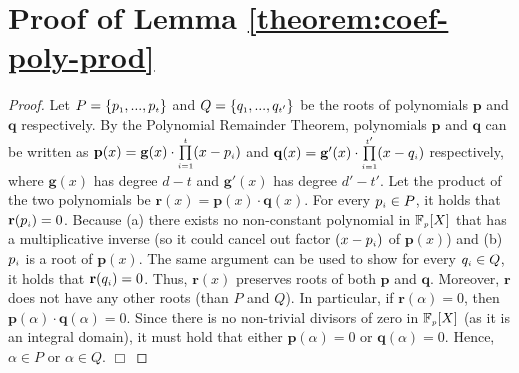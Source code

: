 

\section{Proof of Lemma \ref{theorem:coef-poly-prod}}\label{sec::proof-of-poly-union}

\begin{proof}
Let $P=\{p_{\scriptscriptstyle 1},...,p_{\scriptscriptstyle t}\}$ and $Q=\{q_{\scriptscriptstyle 1},...,q_{\scriptscriptstyle t'}\}$ be the roots of polynomials $\mathbf{p}$ and   $\mathbf{q}$  respectively.  By the Polynomial Remainder Theorem,  polynomials $\mathbf{p}$ and $\mathbf{q}$  can be written as $\mathbf{p}(x)=\mathbf{g}(x)\cdot\prod\limits_{\scriptscriptstyle i=1}^{\scriptscriptstyle t}(x-p_{\scriptscriptstyle i})$ and $\mathbf{q}(x)=\mathbf{g}'(x)\cdot\prod\limits_{\scriptscriptstyle i=1}^{\scriptscriptstyle t'}(x-q_{\scriptscriptstyle i})$ respectively, where $\mathbf{g}(x)$ has degree $d-t$ and $\mathbf{g}'(x)$ has degree $d'-t'$. Let the product of the two polynomials be $\mathbf{r}(x)=\mathbf{p}(x)\cdot \mathbf{q}(x)$. For every $p_{\scriptscriptstyle i}\in P$, it holds  that $\mathbf{r}(p_{\scriptscriptstyle i})=0$. Because (a) there exists no non-constant polynomial in $\mathbb{F}_{\scriptscriptstyle p}[X]$ that has a multiplicative inverse (so it could cancel out factor $(x-p_{\scriptscriptstyle i})$ of $\mathbf{p}(x)$) and (b) $p_{\scriptscriptstyle i}$ is a root of $\mathbf{p}(x)$. The same argument  can be used to show for every $q_{\scriptscriptstyle i}\in Q$, it holds  that $\mathbf{r}(q_{\scriptscriptstyle i})=0$. Thus, $\mathbf{r}(x)$ preserves  roots of  both  $\mathbf{p}$ and $\mathbf{q}$. Moreover, $\mathbf{r}$ does not have any other roots (than $P$ and $Q$). In particular, if $\mathbf{r}(\alpha)=0$, then $\mathbf{p}(\alpha)\cdot \mathbf{q}(\alpha)=0$. Since there is no non-trivial divisors of zero in $\mathbb{F}_{\scriptscriptstyle p}[X]$  (as it is an integral domain), it must hold that either $\mathbf{p}(\alpha)=0$ or $\mathbf{q}(\alpha)=0$. Hence, $\alpha\in P$ or $\alpha\in Q$.  %
\hfill\(\Box\)
\end{proof}

%
